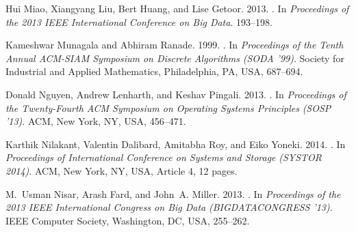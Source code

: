 \documentclass[reprint,twocolumn,showpacs,preprintnumbers,amsmath, aps,pre,amssymb]{revtex4-1}
\begin{document}
\begin{thebibliography}{00}
{
{Hui Miao}, {Xiangyang Liu}, {Bert Huang}, {and} {Lise Getoor}. 2013.
\newblock {}. In {\em Proceedings of the
  2013 IEEE International Conference on Big Data}. 193--198.
\newblock


{Kameshwar Munagala} {and} {Abhiram Ranade}. 1999.
\newblock {}. In {\em
  Proceedings of the Tenth Annual ACM-SIAM Symposium on Discrete Algorithms}
  {\em (SODA '99)}. Society for Industrial and Applied Mathematics,
  Philadelphia, PA, USA, 687--694.
\newblock
{}


{Donald Nguyen}, {Andrew Lenharth}, {and} {Keshav Pingali}. 2013.
\newblock {}.
  In {\em Proceedings of the Twenty-Fourth ACM Symposium on Operating Systems
  Principles} {\em (SOSP '13)}. ACM, New York, NY, USA, 456--471.
\newblock
{}


{Karthik Nilakant}, {Valentin Dalibard}, {Amitabha Roy}, {and} {Eiko Yoneki}.
  2014.
\newblock {}. In {\em Proceedings of International Conference on Systems and
  Storage} {\em (SYSTOR 2014)}. ACM, New York, NY, USA, Article 4, 12 pages.
\newblock
{}


{M.~Usman Nisar}, {Arash Fard}, {and} {John~A. Miller}. 2013.
\newblock {}. In
  {\em Proceedings of the 2013 IEEE International Congress on Big Data} {\em
  (BIGDATACONGRESS '13)}. IEEE Computer Society, Washington, DC, USA, 255--262.
\newblock
{}


}
\end{thebibliography}
\end{document}
